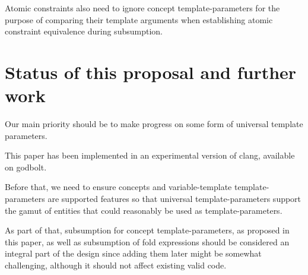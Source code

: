 \documentclass{wg21}
\begin{document}
Atomic constraints also need to ignore concept template-parameters for the purpose
of comparing their template arguments when establishing atomic constraint equivalence during subsumption.


\section{Status of this proposal and further work}

Our main priority should be to make progress on some form of universal template parameters.

This paper has been implemented in an experimental version of clang, available on godbolt.

Before that, we need to ensure concepts and variable-template template-parameters are supported features so that universal
template-parameters support the gamut of entities that could reasonably be used as template-parameters.

As part of that, subsumption for concept template-parameters, as proposed in this paper, as well as subsumption of fold expressions
should be considered an integral part of the design since adding them later might be somewhat challenging, although it should not affect existing valid code.

%
%
%
%
\end{document}
